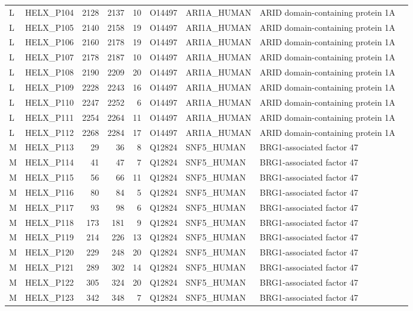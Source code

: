 \begin{longtable}{@{}llrrrrllp{5.2cm}@{}}
  L & HELX_P104 & 2128 & 2137 & 10 & O14497 & ARI1A_HUMAN & ARID domain-containing protein 1A \\
  L & HELX_P105 & 2140 & 2158 & 19 & O14497 & ARI1A_HUMAN & ARID domain-containing protein 1A \\
  L & HELX_P106 & 2160 & 2178 & 19 & O14497 & ARI1A_HUMAN & ARID domain-containing protein 1A \\
  L & HELX_P107 & 2178 & 2187 & 10 & O14497 & ARI1A_HUMAN & ARID domain-containing protein 1A \\
  L & HELX_P108 & 2190 & 2209 & 20 & O14497 & ARI1A_HUMAN & ARID domain-containing protein 1A \\
  L & HELX_P109 & 2228 & 2243 & 16 & O14497 & ARI1A_HUMAN & ARID domain-containing protein 1A \\
  L & HELX_P110 & 2247 & 2252 & 6 & O14497 & ARI1A_HUMAN & ARID domain-containing protein 1A \\
  L & HELX_P111 & 2254 & 2264 & 11 & O14497 & ARI1A_HUMAN & ARID domain-containing protein 1A \\
  L & HELX_P112 & 2268 & 2284 & 17 & O14497 & ARI1A_HUMAN & ARID domain-containing protein 1A \\
  M & HELX_P113 & 29 & 36 & 8 & Q12824 & SNF5_HUMAN & BRG1-associated factor 47 \\
  M & HELX_P114 & 41 & 47 & 7 & Q12824 & SNF5_HUMAN & BRG1-associated factor 47 \\
  M & HELX_P115 & 56 & 66 & 11 & Q12824 & SNF5_HUMAN & BRG1-associated factor 47 \\
  M & HELX_P116 & 80 & 84 & 5 & Q12824 & SNF5_HUMAN & BRG1-associated factor 47 \\
  M & HELX_P117 & 93 & 98 & 6 & Q12824 & SNF5_HUMAN & BRG1-associated factor 47 \\
  M & HELX_P118 & 173 & 181 & 9 & Q12824 & SNF5_HUMAN & BRG1-associated factor 47 \\
  M & HELX_P119 & 214 & 226 & 13 & Q12824 & SNF5_HUMAN & BRG1-associated factor 47 \\
  M & HELX_P120 & 229 & 248 & 20 & Q12824 & SNF5_HUMAN & BRG1-associated factor 47 \\
  M & HELX_P121 & 289 & 302 & 14 & Q12824 & SNF5_HUMAN & BRG1-associated factor 47 \\
  M & HELX_P122 & 305 & 324 & 20 & Q12824 & SNF5_HUMAN & BRG1-associated factor 47 \\
  M & HELX_P123 & 342 & 348 & 7 & Q12824 & SNF5_HUMAN & BRG1-associated factor 47 \\

\end{longtable}
